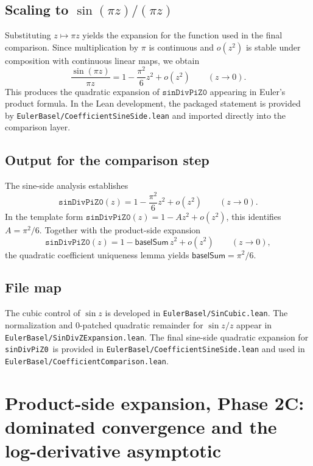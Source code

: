 \documentclass[11pt,a4paper]{article}
\theoremstyle{plain}
\theoremstyle{definition}
\DeclareRobustCommand{\codepath}[1]{\nolinkurl{#1}}
\newcommand{\msec}[2]{\texorpdfstring{#1}{#2}}
\DeclareRobustCommand{\leanid}[1]{\texttt{#1}}
\DeclareRobustCommand{\codepath}[1]{\nolinkurl{#1}}
\newcommand{\baselSum}{\ensuremath{\mathsf{baselSum}}}
\newcommand{\sinDivPiZZero}{\leanid{sinDivPiZ0}}
\begin{document}
\subsection{Scaling to \msec{\ensuremath{\sin(\pi z)/(\pi z)}}{sin(pi z)/(pi z)}}

Substituting $z \mapsto \pi z$ yields the expansion for the function used in the final comparison. Since multiplication by $\pi$ is continuous and $o(z^{2})$ is stable under composition with continuous linear maps, we obtain
\[
\frac{\sin(\pi z)}{\pi z}
=
1 - \frac{\pi^{2}}{6} z^{2} + o(z^{2})
\qquad (z \to 0).
\]
This produces the quadratic expansion of $\sinDivPiZZero$ appearing in Euler’s product formula. In the Lean development, the packaged statement is provided by \codepath{EulerBasel/CoefficientSineSide.lean} and imported directly into the comparison layer.

\subsection{Output for the comparison step}

The sine-side analysis establishes
\[
\sinDivPiZZero(z)
=
1 - \frac{\pi^{2}}{6} z^{2} + o(z^{2})
\qquad (z \to 0).
\]
In the template form $\sinDivPiZZero(z) = 1 - A z^{2} + o(z^{2})$, this identifies $A = \pi^{2}/6$. Together with the product-side expansion
\[
\sinDivPiZZero(z)
=
1 - \baselSum\, z^{2} + o(z^{2})
\qquad (z \to 0),
\]
the quadratic coefficient uniqueness lemma yields $\baselSum = \pi^{2}/6$.

\subsection{File map}

The cubic control of $\sin z$ is developed in \codepath{EulerBasel/SinCubic.lean}.  
The normalization and $0$-patched quadratic remainder for $\sin z / z$ appear in \codepath{EulerBasel/SinDivZExpansion.lean}.  
The final sine-side quadratic expansion for \sinDivPiZZero\ is provided in \codepath{EulerBasel/CoefficientSineSide.lean} and used in \codepath{EulerBasel/CoefficientComparison.lean}.

\section{\msec{Product-side expansion, Phase 2C: dominated convergence and the log-derivative asymptotic}{Product-side expansion, Phase 2C: dominated convergence and the log-derivative asymptotic}}
\end{document}
